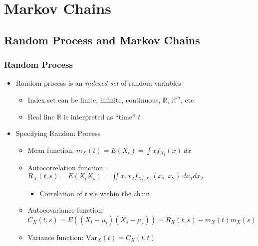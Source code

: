 \section{Markov Chains}

\subsection{Random Process and Markov Chains}

\subsubsection*{Random Process}
\begin{itemize}
    \item Random process is an \textit{indexed set} of random variables
    \begin{itemize}
        \item Index set can be finite, infinite, continuous, $\mathbb{R}$, $\mathbb{R}^m$, etc
        \item Real line $\mathbb{R}$ is interpreted as ``time'' $t$
    \end{itemize}
    \item Specifying Random Process
    \begin{itemize}
        \item Mean function: $m_X(t)=E(X_t)=\int xf_{X_t}(x)~dx$
        \item Autocorrelation function: $R_X(t,s)=E(X_tX_s)=\iint x_1x_2f_{X_t,X_s}(x_1,x_2)~dx_1dx_2$
        \begin{itemize}
            \item Correlation of r.v.s within the chain
        \end{itemize}
        \item Autocovariance function: $C_X(t,s)=E\left((X_t-\mu_t)(X_s-\mu_s)\right)=R_X(t,s)-m_X(t)m_X(s)$
        \item Variance function: $\text{Var}_X(t)=C_X(t,t)$
    \end{itemize}
\end{itemize}

